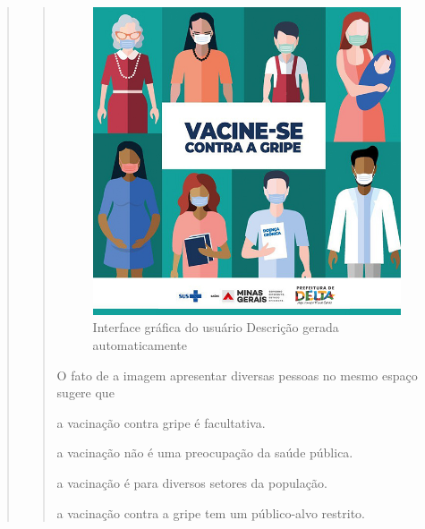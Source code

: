 \begin{escolha}
\begin{escolha}
\begin{escolha}
\begin{quote}
\begin{quote}
{\begin{figure}
\centering
\includegraphics{./imgQ4PORT/media/image7.jpeg}
\caption{Interface gráfica do usuário Descrição gerada automaticamente}
\end{figure}


O fato de a imagem apresentar diversas pessoas no mesmo espaço sugere
que

\begin{escolha}
  \item a vacinação contra gripe é facultativa.

  \item a vacinação não é uma preocupação da saúde pública.

  \item a vacinação é para diversos setores da população.

  \item a vacinação contra a gripe tem um público-alvo restrito.
\end{escolha}

}
\end{quote}
\end{quote}
\end{escolha}
\end{escolha}
\end{escolha}
